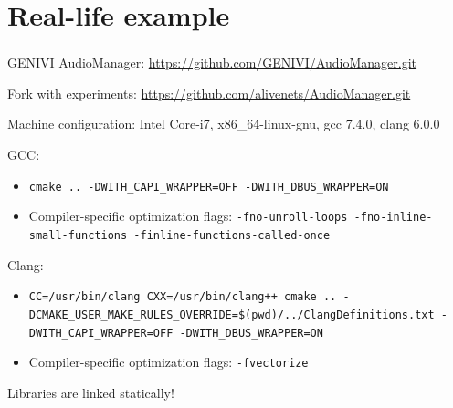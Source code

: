 \documentclass{beamer}
\begin{document}
\section{Real-life example}
\begin{frame}
\frametitle{\secname}
GENIVI AudioManager: \url{https://github.com/GENIVI/AudioManager.git}

Fork with experiments: \url{https://github.com/alivenets/AudioManager.git}

Machine configuration: Intel Core-i7, x86\_64-linux-gnu, gcc 7.4.0, clang 6.0.0

GCC:
\begin{itemize} 
\item \texttt{cmake .. -DWITH\_CAPI\_WRAPPER=OFF -DWITH\_DBUS\_WRAPPER=ON} 
\item Compiler-specific optimization flags: \texttt{-fno-unroll-loops -fno-inline-small-functions -finline-functions-called-once}
\end{itemize}
Clang: 
\begin{itemize}
\item \texttt{CC=/usr/bin/clang CXX=/usr/bin/clang++ cmake .. -DCMAKE\_USER\_MAKE\_RULES\_OVERRIDE=\$(pwd)/../ClangDefinitions.txt -DWITH\_CAPI\_WRAPPER=OFF -DWITH\_DBUS\_WRAPPER=ON}
\item Compiler-specific optimization flags: \texttt{-fvectorize}
\end{itemize}

Libraries are linked statically!
\end{frame}
\end{document}
